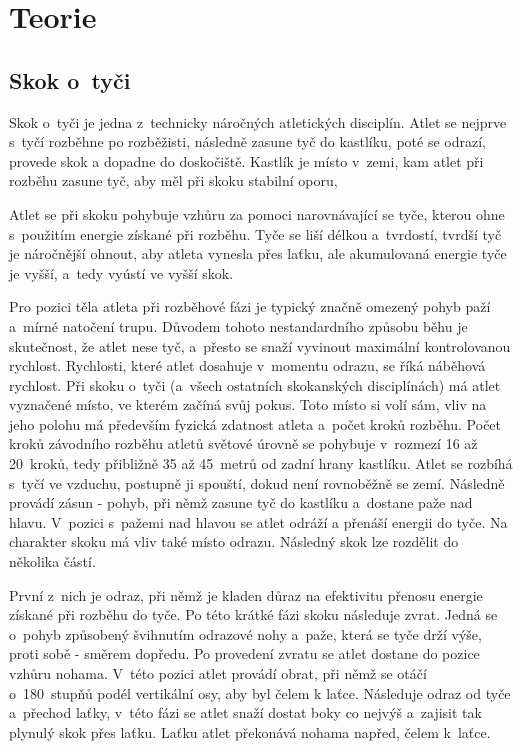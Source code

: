\chapter{Teorie}

\section{Skok o~tyči}

Skok o~tyči je jedna z~technicky náročných atletických disciplín. Atlet se nejprve s~tyčí rozběhne po rozběžisti, následně zasune tyč do kastlíku, poté se odrazí, provede skok a dopadne do doskočiště. Kastlík je místo v~zemi, kam atlet při rozběhu zasune tyč, aby měl při skoku stabilní oporu,

Atlet se při skoku pohybuje vzhůru za pomoci narovnávající se tyče, kterou ohne s~použitím energie získané při rozběhu. Tyče se liší délkou a~tvrdostí, tvrdší tyč je náročnější ohnout, aby atleta vynesla přes laťku, ale akumulovaná energie tyče je vyšší, a~tedy vyústí ve vyšší skok.

Pro pozici těla atleta při rozběhové fázi je typický značně omezený pohyb paží a~mírné natočení trupu. Důvodem tohoto nestandardního způsobu běhu je skutečnost, že atlet nese tyč, a~přesto se snaží vyvinout maximální kontrolovanou rychlost. Rychlosti, které atlet dosahuje v~momentu odrazu, se říká náběhová rychlost. Při skoku o~tyči (a~všech ostatních skokanských disciplínách) má atlet vyznačené místo, ve kterém začíná svůj pokus. Toto místo si volí sám, vliv na jeho polohu má především fyzická zdatnost atleta a~počet kroků rozběhu. Počet kroků závodního rozběhu atletů světové úrovně se pohybuje v~rozmezí 16 až 20~kroků, tedy přibližně 35 až 45~metrů od zadní hrany kastlíku. Atlet se rozbíhá s~tyčí ve vzduchu, postupně ji spouští, dokud není rovnoběžně se zemí. Následně provádí zásun - pohyb, při němž zasune tyč do kastlíku a~dostane paže nad hlavu. V~pozici s~pažemi nad hlavou se atlet odráží a přenáší energii do tyče. Na charakter skoku má vliv také místo odrazu. Následný skok lze rozdělit do několika částí.

První z~nich je odraz, při němž je kladen důraz na efektivitu přenosu energie získané při rozběhu do tyče. Po této krátké fázi skoku následuje zvrat. Jedná se o~pohyb způsobený švihnutím odrazové nohy a~paže, která se tyče drží výše, proti sobě - směrem dopředu. Po provedení zvratu se atlet dostane do pozice vzhůru nohama. V~této pozici atlet provádí obrat, při němž se otáčí o~180~stupňů podél vertikální osy, aby byl čelem k laťce. Následuje odraz od tyče a~přechod laťky, v~této fázi se atlet snaží dostat boky co nejvýš a~zajisit tak plynulý skok přes laťku. Laťku atlet překonává nohama napřed, čelem k~laťce.

